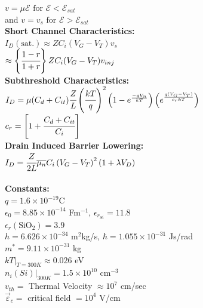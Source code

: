 \documentclass[8pt]{article}
\newcommand{\sect}[1]{\noindent\textbf{#1}\\}
\newcommand\tab[1][1cm]{\hspace*{#1}}
\begin{document}
\begin{multicols*}{2}
\begin{small}
		\tab[0.53cm] $v = \mu \mathcal{E} \text{ for } \mathcal{E} < \mathcal{E}_{sat}$ \\
		and $ v = v_s \text{ for } \mathcal{E} > \mathcal{E}_{sat} $ \\
		\sect{Short Channel Characteristics:}
		$ I_D(\text{sat.}) \approx ZC_i(V_G - V_T)v_s $ \\
		\tab[1.23cm] $ \approx \left\{\cfrac{1 - r}{1 + r}\right\} ZC_i(V_G-V_T)v_{inj} $ \\
		\sect{Subthreshold Characteristics:}
		$ I_D = \mu(C_d + C_{it}) \cfrac{Z}{L}\left( \cfrac{kT}{q} \right)^2\left( 1 - e^{\frac{-qV_n}{kT}} \right) \left( e^{\frac{q(V_G-V_T)}{c_rkT}} \right) $ \\
		$ c_r = \left[ 1 + \cfrac{C_d + C_{it}}{C_i} \right] $ \\
		\sect{Drain Induced Barrier Lowering:}
		$ I_D = \cfrac{Z}{2L} \overline{\mu_n} C_i \left( V_G - V_T \right)^2 \left( 1 + \lambda V_D \right) $\\~\\
		\sect{Constants:}
		$q = 1.6\times10^{-19}$C\\
		$\epsilon_0 = 8.85\times10^{-14}$ Fm$^{-1}$,  $\epsilon_{r_{Si}} = 11.8$\\
		$ \epsilon_r(\text{SiO}_2) = 3.9 $ \\
		$h = 6.626 \times 10^{-34}$ m$^2$kg/s, \tab[0.25cm] $\hbar = 1.055 \times 10^{-31} $ Js/rad\\ 
		$m^* = 9.11 \times 10^{-31}$ kg\\
		$kT|_{T=300K} \approx 0.026$ eV \\
		$n_i(Si)|_{300K} = 1.5 \times 10^{10}$ cm$^{-3}$\\
		$v_{th} =$ Thermal Velocity $\approx 10^7$ cm/sec \\
		$\vec{\varepsilon}_c =$ critical field $= 10^4$ V/cm
		\end{small}
	\end{multicols*}
	
\end{document}
